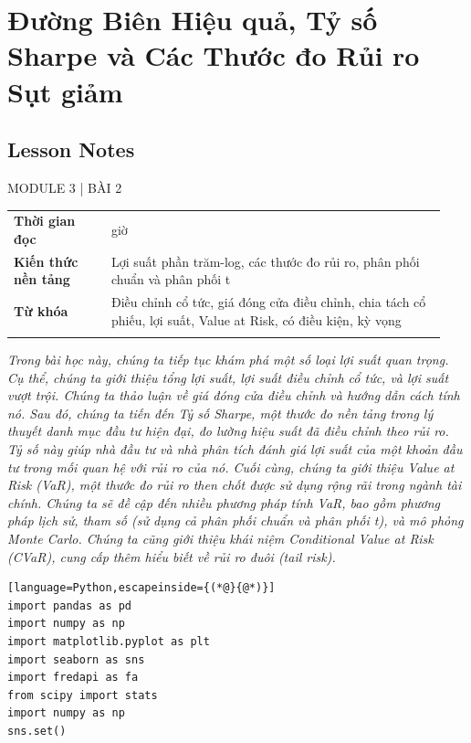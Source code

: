 \chapter{Đường Biên Hiệu quả, Tỷ số Sharpe và Các Thước đo Rủi ro Sụt giảm}
\label{ch:M3L2}


\section*{Lesson Notes}

MODULE 3 | BÀI 2

{\small
\begin{longtable}{>{\raggedright\arraybackslash}p{0.213\linewidth}>{\raggedright\arraybackslash}p{0.727\linewidth}}
\toprule
\textbf{Thời gian đọc} & 6 giờ \\
\addlinespace[2pt]
\textbf{Kiến thức nền tảng} & Lợi suất phần trăm-log, các thước đo rủi ro, phân phối chuẩn và phân phối t \\
\addlinespace[2pt]
\textbf{Từ khóa} & Điều chỉnh cổ tức, giá đóng cửa điều chỉnh, chia tách cổ phiếu, lợi suất, Value at Risk, có điều kiện, kỳ vọng \\
\addlinespace[2pt]
\bottomrule
\end{longtable}
}

\emph{Trong bài học này, chúng ta tiếp tục khám phá một số loại lợi suất quan trọng. Cụ thể, chúng ta giới thiệu tổng lợi suất, lợi suất điều chỉnh cổ tức, và lợi suất vượt trội. Chúng ta thảo luận về giá đóng cửa điều chỉnh và hướng dẫn cách tính nó. Sau đó, chúng ta tiến đến Tỷ số Sharpe, một thước đo nền tảng trong lý thuyết danh mục đầu tư hiện đại, đo lường hiệu suất đã điều chỉnh theo rủi ro. Tỷ số này giúp nhà đầu tư và nhà phân tích đánh giá lợi suất của một khoản đầu tư trong mối quan hệ với rủi ro của nó. Cuối cùng, chúng ta giới thiệu Value at Risk (VaR), một thước đo rủi ro then chốt được sử dụng rộng rãi trong ngành tài chính. Chúng ta sẽ đề cập đến nhiều phương pháp tính VaR, bao gồm phương pháp lịch sử, tham số (sử dụng cả phân phối chuẩn và phân phối t), và mô phỏng Monte Carlo. Chúng ta cũng giới thiệu khái niệm Conditional Value at Risk (CVaR), cung cấp thêm hiểu biết về rủi ro đuôi (tail risk).}

\begin{lstlisting}[language=Python,escapeinside={(*@}{@*)}]
import pandas as pd
import numpy as np
import matplotlib.pyplot as plt
import seaborn as sns
import fredapi as fa
from scipy import stats
import numpy as np
sns.set()
\end{lstlisting}

